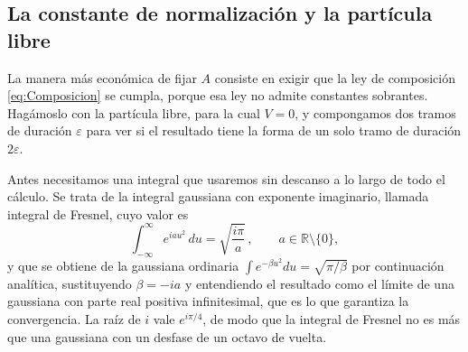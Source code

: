     \subsection{La constante de normalización y la partícula libre}

        La manera más económica de fijar $A$ consiste en exigir que la ley de composición \eqref{eq:Composicion} se cumpla, porque esa ley no admite constantes sobrantes. Hagámoslo con la partícula libre, para la cual $V=0$, y compongamos dos tramos de duración $\varepsilon$ para ver si el resultado tiene la forma de un solo tramo de duración $2\varepsilon$.

        Antes necesitamos una integral que usaremos sin descanso a lo largo de todo el cálculo. Se trata de la integral gaussiana con exponente imaginario, llamada integral de Fresnel, cuyo valor es
        \begin{equation}\label{eq:Fresnel}
            \int_{-\infty}^{\infty} e^{i a u^{2}}\,du = \sqrt{\frac{i\pi}{a}}\,,
            \qquad a \in \mathbb{R}\setminus\{0\},
        \end{equation}
        y que se obtiene de la gaussiana ordinaria $\int e^{-\beta u^{2}}du = \sqrt{\pi/\beta}$ por continuación analítica, sustituyendo $\beta = -ia$ y entendiendo el resultado como el límite de una gaussiana con parte real positiva infinitesimal, que es lo que garantiza la convergencia. La raíz de $i$ vale $e^{i\pi/4}$, de modo que la integral de Fresnel no es más que una gaussiana con un desfase de un octavo de vuelta.

